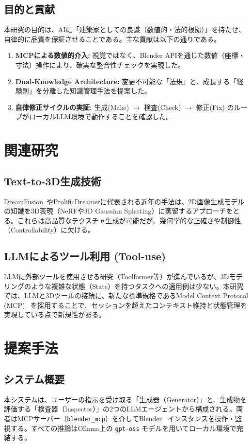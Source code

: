\documentclass{deimj}
\begin{document}
\subsection{目的と貢献}
本研究の目的は、AIに「建築家としての良識（数値的・法的根拠）」を持たせ、自律的に品質を保証させることである。主な貢献は以下の通りである。
\begin{enumerate}
  \item \textbf{MCPによる数値的介入:} 視覚ではなく、Blender APIを通じた数値（座標・寸法）操作により、確実な整合性チェックを実現した。
  \item \textbf{Dual-Knowledge Architecture:} 変更不可能な「法規」と、成長する「経験則」を分離した知識管理手法を提案した。
  \item \textbf{自律修正サイクルの実証:} 生成(Make) $\to$ 検査(Check) $\to$ 修正(Fix) のループがローカルLLM環境で動作することを確認した。
\end{enumerate}

\section{関連研究}

\subsection{Text-to-3D生成技術}
DreamFusion~\cite{DreamFusion}やProlificDreamerに代表される近年の手法は、2D画像生成モデルの知識を3D表現（NeRFや3D Gaussian Splatting）に蒸留するアプローチをとる。これらは高品質なテクスチャ生成が可能だが、幾何学的な正確さや制御性（Controllability）に欠ける。

\subsection{LLMによるツール利用 (Tool-use)}
LLMに外部ツールを使用させる研究（Toolformer等）が進んでいるが、3Dモデリングのような複雑な状態（State）を持つタスクへの適用例は少ない。本研究では、LLMと3Dツールの接続に、新たな標準規格であるModel Context Protocol (MCP)~\cite{MCP} を採用することで、セッションを超えたコンテキスト維持と状態管理を実現している点で新規性がある。

\section{提案手法}

\subsection{システム概要}
本システムは、ユーザーの指示を受け取る「生成器（Generator）」と、生成物を評価する「検査器（Inspector）」の2つのLLMエージェントから構成される。両者はMCPサーバー（\texttt{blender\_mcp}）を介してBlender~\cite{Blender} インスタンスを操作・監視する。すべての推論はOllama上の \texttt{gpt-oss} モデルを用いてローカル環境で完結する。
\end{document}
